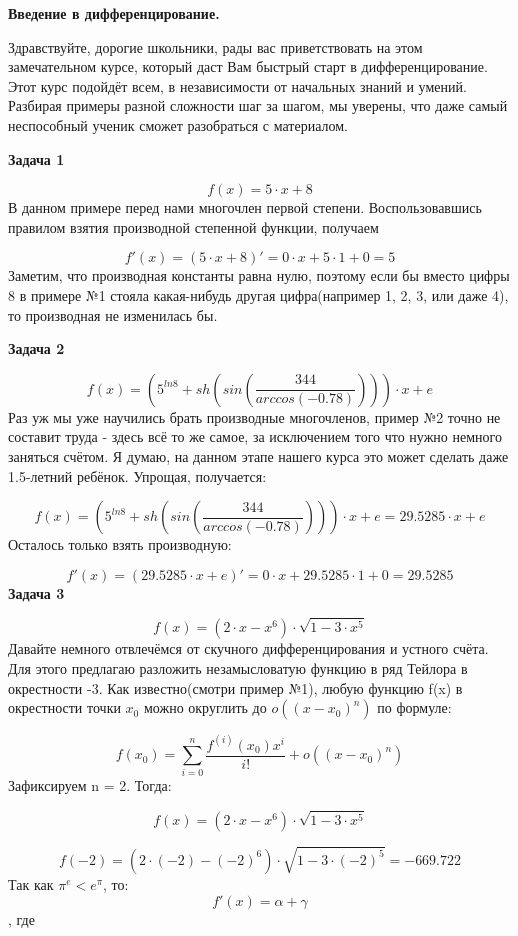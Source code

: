 \documentclass[12pt,a4paper,fleqn]{article}
\begin{document}
\begin{center}
{\bf \Large
Введение в дифференцирование.
}
\end{center}
Здравствуйте, дорогие школьники, рады вас приветствовать на этом замечательном курсе, который даст Вам быстрый старт в дифференцирование. Этот курс подойдёт всем, в независимости от начальных знаний и умений. Разбирая примеры разной сложности шаг за шагом, мы уверены, что даже самый неспособный ученик сможет разобраться с материалом.


\newpage
{\bf \Large
Задача 1
}

$$
f(x)=5\cdot x+8
$$
В данном примере перед нами многочлен первой степени. Воспользовавшись правилом взятия производной степенной функции, получаем

$$
f'(x)=(5\cdot x+8)'=0\cdot x+5\cdot1+0=5
$$
Заметим, что производная константы равна нулю, поэтому если бы вместо цифры 8 в примере №1 стояла какая-нибудь другая цифра(например 1, 2, 3, или даже 4), то производная не изменилась бы.

{\bf \Large
Задача 2
}

$$
f(x)=\left(5^{ ln8}+ sh\left( sin\left(\frac{344}{ arccos\left(-0.78\right)}\right)\right)\right)\cdot x+e
$$
Раз уж мы уже научились брать производные многочленов, пример №2 точно не составит труда - здесь всё то же самое, за исключением того что нужно немного заняться счётом. Я думаю, на данном этапе нашего курса это может сделать даже 1.5-летний ребёнок. Упрощая, получается:

$$
f(x)=\left(5^{ ln8}+ sh\left( sin\left(\frac{344}{ arccos\left(-0.78\right)}\right)\right)\right)\cdot x+e=29.5285\cdot x+e
$$
Осталось только взять производную:

$$
f'(x)=(29.5285\cdot x+e)'=0\cdot x+29.5285\cdot1+0=29.5285
$$
{\bf \Large
Задача 3
}

$$
f(x)=\left(2\cdot x- x^{6}\right)\cdot\sqrt{1-3\cdot x^{5}}
$$
Давайте немного отвлечёмся от скучного дифференцирования и устного счёта. Для этого предлагаю разложить незамысловатую функцию в ряд Тейлора в окрестности -3.
Как известно(смотри пример №1), любую функцию f(x) в окрестности точки $x_{0}$ можно округлить до $o((x-x_{0})^{n})$ по формуле:

$$
f(x_{0})=\sum_{i=0}^{n}\frac{f^{(i)}(x_{0})x^i}{i!} + o((x-x_{0})^{n})
$$
Зафиксируем n = 2. Тогда:

$$
f(x)=\left(2\cdot x- x^{6}\right)\cdot\sqrt{1-3\cdot x^{5}}
$$

$$
f(-2)=\left(2\cdot(-2)-(-2)^{6}\right)\cdot\sqrt{1-3\cdot(-2)^{5}}=-669.722
$$
Так как $\pi^{e}<e^{\pi}$, то:
$$
f'(x)= \alpha+ \gamma
$$
, где
\end{document}
